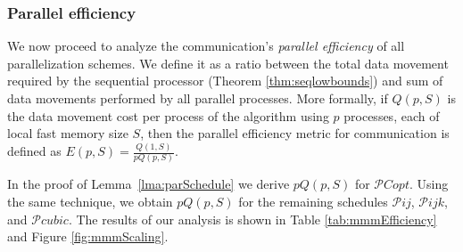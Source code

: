\documentclass[sigplan,review,anonymous]{acmart}\settopmatter{printfolios=true,printccs=false,printacmref=false}
\begin{document}
\subsubsection{Parallel efficiency} 
We now proceed to analyze the 
communication's 
\emph{parallel efficiency} of all parallelization schemes. We define it as a 
ratio between  
the total data movement required by the sequential processor (Theorem 
\ref{thm:seqlowbounds}) and sum of data movements performed by all 
parallel
processes. More 
formally, if $Q(p,S)$ is the data movement cost per process of the 
algorithm 
using $p$ 
processes, each of local fast memory size $S$, then the parallel 
efficiency 
metric for communication is defined as $E(p,S) = 
\frac{Q(1,S)}{pQ(p,S)}$.

In the proof of Lemma~\ref{lma:parSchedule} we derive $pQ(p,S)$ for 
$\mathcal{P}Copt$. Using the same technique, we obtain $pQ(p,S)$ for the 
remaining schedules $\mathcal{P}ij$, $\mathcal{P}ijk$, and $\mathcal{P}cubic$.
The results of our analysis is shown in Table \ref{tab:mmmEfficiency} 
and 
Figure \ref{fig:mmmScaling}.
\end{document}
